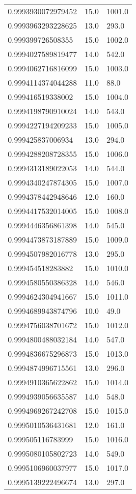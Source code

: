 \begin{center}
\begin{supertabular}[H]{p{0.30\textwidth}p{0.05\textwidth}p{0.05\textwidth}}
0.9993930072979452 & 15.0 & 1001.0 \\ 
0.9993963293228625 & 13.0 & 293.0 \\ 
0.999399726508355 & 15.0 & 1002.0 \\ 
0.9994027589819477 & 14.0 & 542.0 \\ 
0.9994062716816099 & 15.0 & 1003.0 \\ 
0.9994114374044288 & 11.0 & 88.0 \\ 
0.999416519338002 & 15.0 & 1004.0 \\ 
0.9994198790910024 & 14.0 & 543.0 \\ 
0.9994227194209233 & 15.0 & 1005.0 \\ 
0.999425837006934 & 13.0 & 294.0 \\ 
0.9994288208728355 & 15.0 & 1006.0 \\ 
0.9994313189022053 & 14.0 & 544.0 \\ 
0.9994340247874305 & 15.0 & 1007.0 \\ 
0.9994378442948646 & 12.0 & 160.0 \\ 
0.9994417532014005 & 15.0 & 1008.0 \\ 
0.9994446356861398 & 14.0 & 545.0 \\ 
0.9994473873187889 & 15.0 & 1009.0 \\ 
0.9994507982016778 & 13.0 & 295.0 \\ 
0.999454518283882 & 15.0 & 1010.0 \\ 
0.9994580550386328 & 14.0 & 546.0 \\ 
0.9994624304941667 & 15.0 & 1011.0 \\ 
0.9994689943874796 & 10.0 & 49.0 \\ 
0.9994756038701672 & 15.0 & 1012.0 \\ 
0.9994800488032184 & 14.0 & 547.0 \\ 
0.9994836675296873 & 15.0 & 1013.0 \\ 
0.9994874996715561 & 13.0 & 296.0 \\ 
0.9994910365622862 & 15.0 & 1014.0 \\ 
0.9994939056635587 & 14.0 & 548.0 \\ 
0.9994969267242708 & 15.0 & 1015.0 \\ 
0.9995010536431681 & 12.0 & 161.0 \\ 
0.999505116783999 & 15.0 & 1016.0 \\ 
0.9995080105802723 & 14.0 & 549.0 \\ 
0.9995106960037977 & 15.0 & 1017.0 \\ 
0.9995139222496674 & 13.0 & 297.0 \\ 

\end{supertabular}
\end{center}
